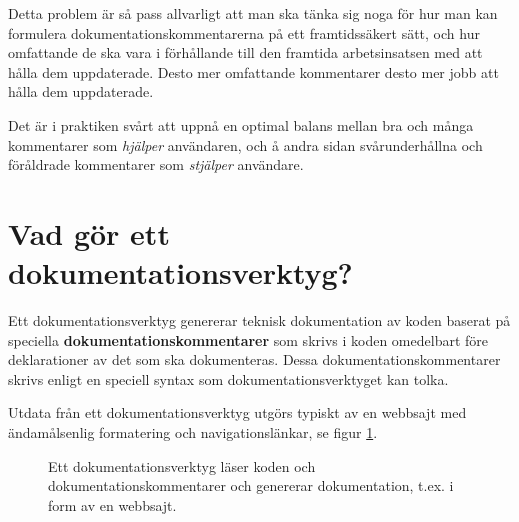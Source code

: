 Detta problem är så pass allvarligt att man ska tänka sig noga för hur man kan formulera  dokumentationskommentarerna på ett framtidssäkert sätt, och hur omfattande de ska vara i förhållande till den framtida arbetsinsatsen med att hålla dem uppdaterade. Desto mer omfattande kommentarer desto mer jobb att hålla dem uppdaterade. 

Det är i praktiken svårt att uppnå en optimal balans mellan bra och många kommentarer som \textit{hjälper} användaren, och å andra sidan svårunderhållna och föråldrade kommentarer som \textit{stjälper} användare.


\section{Vad gör ett dokumentationsverktyg?}\label{appendix:buildtool}

Ett dokumentationsverktyg genererar teknisk dokumentation av koden baserat på speciella \textbf{dokumentationskommentarer} som skrivs i koden omedelbart före deklarationer av det som ska dokumenteras. Dessa dokumentationskommentarer skrivs enligt en speciell syntax som dokumentationsverktyget kan tolka.

Utdata från ett dokumentationsverktyg utgörs typiskt av en webbsajt med ändamålsenlig formatering och navigationslänkar, se figur \ref{fig:appendix:doctool}.

\begin{figure}[H]
\centering
{}
    \caption{Ett dokumentationsverktyg läser koden och dokumentationskommentarer och genererar dokumentation, t.ex. i form av en webbsajt.}
    \label{fig:appendix:doctool}
\end{figure}



